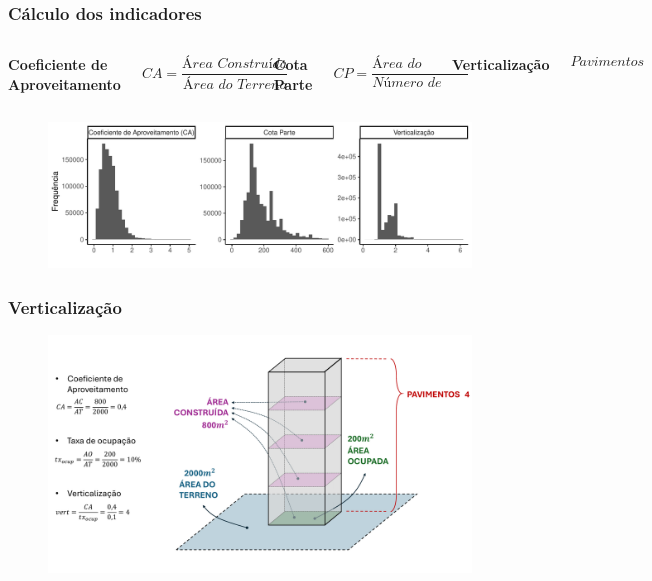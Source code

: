 \documentclass[%
    9pt, 
    aspectratio=169,
]{beamer}
\begin{document}
\begin{frame}
    \frametitle{Cálculo dos indicadores}
    \bigskip

    \begin{columns}[T]
        \centering
        \textbf{Coeficiente de Aproveitamento}
        
        \begin{equation*}
            CA=\frac{\textit{Área Construída}}{\textit{Área do Terreno}}
        \end{equation*}

        \centering
        \textbf{Cota Parte}

        \begin{equation*}
            CP=\frac{\textit{Área do Terreno}}{\textit{Número de Unidades}}
        \end{equation*}

        \centering 
        \textbf{Verticalização}

        \begin{equation*}
            \textit{Pavimentos (?)}
        \end{equation*}
    \end{columns}

    \bigskip

    \begin{figure}
        \centering
        \includegraphics[width = .85\textwidth]{imagens/indicadores.pdf}
    \end{figure}
\end{frame}


\begin{frame}
    \frametitle{Verticalização}
    \begin{figure}
        \centering
        \includegraphics[height = .9\textheight]{imagens/desenho.pdf}
    \end{figure}
\end{frame}
\end{document}
